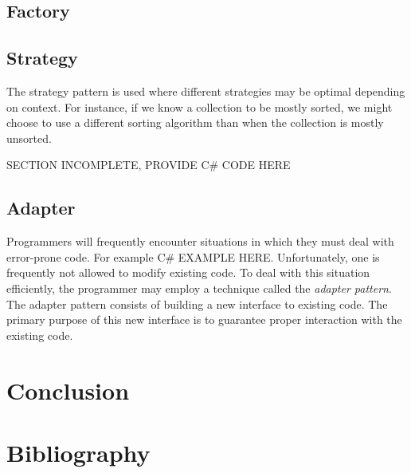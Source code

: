 \documentclass{article}
\begin{document}
\subsection{Factory}
\subsection{Strategy}
The strategy pattern is used where different strategies may be optimal depending on context.
For instance, if we know a collection to be mostly sorted, we might choose to use a different sorting algorithm than when the collection is mostly unsorted.

\huge SECTION INCOMPLETE, PROVIDE C# CODE HERE

\subsection{Adapter}
Programmers will frequently encounter situations in which they must deal with error-prone code.
For example {\huge C# EXAMPLE HERE}.
Unfortunately, one is frequently not allowed to modify existing code.
To deal with this situation efficiently, the programmer may employ a technique called the {\em adapter pattern}.
The adapter pattern consists of building a new interface to existing code.
The primary purpose of this new interface is to guarantee proper interaction with the existing code.

\newpage

\section{Conclusion}


\section{Bibliography}
\end{document}
